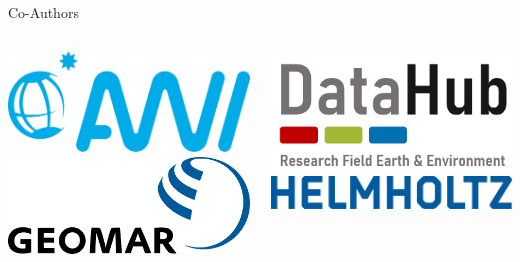 \begin{frame}{Co-Authors}
\begin{columns}[T]
\begin{column}{0.5\linewidth}
		\end{column}
	\end{columns}

	\vspace{1em}

	\begin{columns}[T]
		\begin{column}{0.3\linewidth}
			\centering
			\href{https://www.awi.de}{
				\includegraphics[width=0.5\linewidth]{figures/awi_logo.pdf}
			} \\
			\vspace{1em}
			\href{https://www.geomar.de}{
				\includegraphics[width=0.5\linewidth]{figures/geomar_logo.pdf}
			}
		\end{column}

		\begin{column}{0.3\linewidth}
			\centering
			\href{https://datahub.erde-und-umwelt.de}{
				\includegraphics[width=0.5\linewidth]{figures/datahub.png}
			 } \\
			\vspace{1em}
			\href{https://www.helmholtz.de/}{
				\includegraphics[width=0.5\linewidth]{figures/helmholtz.pdf}
			}

		\end{column}


\end{columns}
\end{frame}
